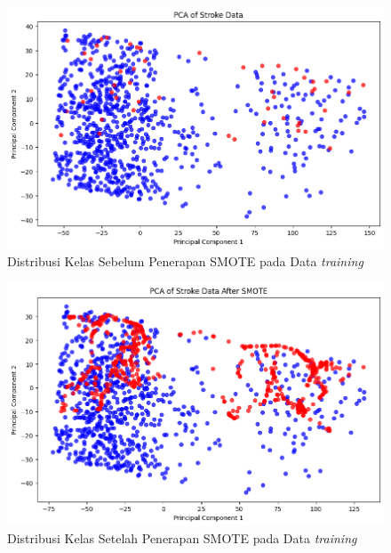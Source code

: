 \documentclass[10pt]{article}
\begin{document}
\begin{multicols}{2}
    \begin{figure}[H]
        \includegraphics[width=\columnwidth]{./assets/before-smote.png}
        \caption{Distribusi Kelas Sebelum Penerapan SMOTE pada Data \textit{training}}%
        \label{fig:class-distribution-before-smote}
    \end{figure}
    \begin{figure}[H]
        \includegraphics[width=\columnwidth]{./assets/after-smote.png}
        \caption{Distribusi Kelas Setelah Penerapan SMOTE pada Data \textit{training}}%
        \label{fig:class-distribution-after-smote}
    \end{figure}

\end{multicols}
\end{document}

